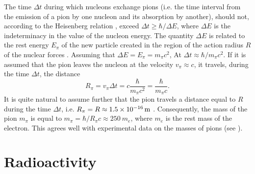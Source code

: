 The time $\Delta t$ during which nucleons exchange pions (i.e. the time interval from the emission of a pion by one nucleon and its absorption by another), should not, according to the Heisenberg relation , exceed $\Delta t \geqslant \hbar/\Delta E$, where $\Delta E$ is the indeterminacy in the value of the nucleon energy. The quantity $\Delta E$ is related to the rest energy $E_{\pi}$ of the new particle created in the region of the action radius $R$ of the nuclear forces . Assuming that $\Delta E = E_{\pi} = m_{\pi}c^{2}$, At $\Delta t \approx \hbar/m_{\pi}c^{2}$. If it is assumed that the pion leaves the nucleon at the velocity $v_{\pi} \approx c$, it travels, during the time $\Delta t$, the distance
\begin{equation*}%
R_{\pi} = v_{\pi} \Delta t = c \frac{\hbar}{m_{\pi}c^{2}} = \frac{\hbar}{m_{\pi}c}.
\end{equation*}
It is quite natural to assume further that the pion travels a distance equal to $R$ during the time $\Delta t$, i.e. $R_{\pi} = R  \approx \SI{1.5d-16}{\meter}$ . Consequently, the mass of the pion $m_{\pi}$ is equal to $m_{\pi} = \hbar/R_{\pi}c \approx 250~m_{e}$, where $m_{e}$ is the rest mass of the electron. This agrees well with experimental data on the masses of pions (see ).

\section{Radioactivity}
\label{sec-42.4} 

\subsection{}\label{42.4.1} 

